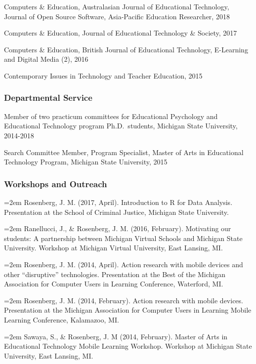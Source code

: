 \documentclass[]{article}
\begin{document}
Computers \& Education, Australasian Journal of Educational Technology,
Journal of Open Source Software, Asia-Pacific Education Researcher, 2018

Computers \& Education, Journal of Educational Technology \& Society,
2017

Computers \& Education, British Journal of Educational Technology,
E-Learning and Digital Media (2), 2016

Contemporary Issues in Technology and Teacher Education, 2015

\hypertarget{departmental-service}{%
\subsubsection{Departmental Service}\label{departmental-service}}

Member of two practicum committees for Educational Psychology and
Educational Technology program Ph.D.~students, Michigan State
University, 2014-2018

Search Committee Member, Program Specialist, Master of Arts in
Educational Technology Program, Michigan State University, 2015

\hypertarget{workshops-and-outreach}{%
\subsubsection{Workshops and Outreach}\label{workshops-and-outreach}}

\hangindent=2em Rosenberg, J. M. (2017, April). Introduction to R for
Data Analysis. Presentation at the School of Criminal Justice, Michigan
State University.

\hangindent=2em Ranellucci, J., \& Rosenberg, J. M. (2016, February).
Motivating our students: A partnership between Michigan Virtual Schools
and Michigan State University. Workshop at Michigan Virtual University,
East Lansing, MI.

\hangindent=2em Rosenberg, J. M. (2014, April). Action research with
mobile devices and other ``disruptive'' technologies. Presentation at
the Best of the Michigan Association for Computer Users in Learning
Conference, Waterford, MI.

\hangindent=2em Rosenberg, J. M. (2014, February). Action research with
mobile devices. Presentation at the Michigan Association for Computer
Users in Learning Mobile Learning Conference, Kalamazoo, MI.

\hangindent=2em Sawaya, S., \& Rosenberg, J. M (2014, February). Master
of Arts in Educational Technology Mobile Learning Workshop. Workshop at
Michigan State University, East Lansing, MI.
\end{document}
